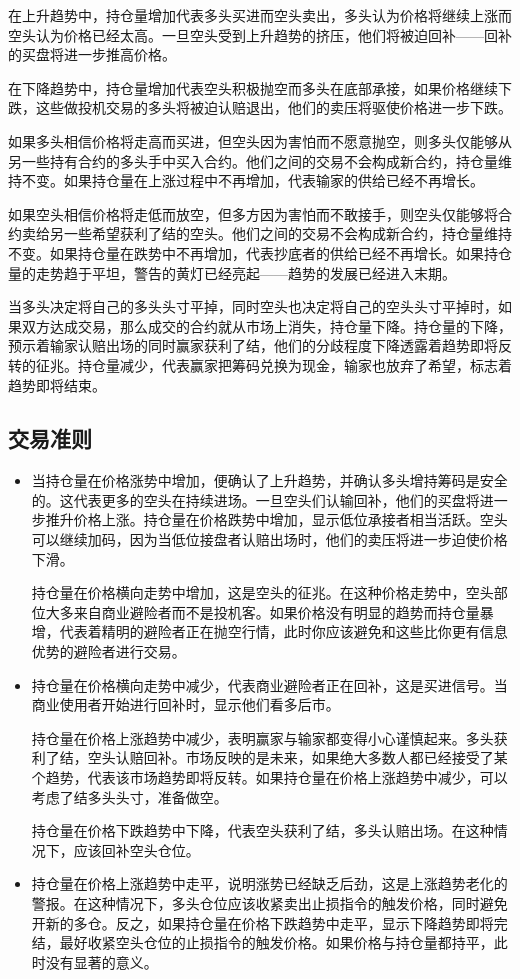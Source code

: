 在上升趋势中，持仓量增加代表多头买进而空头卖出，多头认为价格将继续上涨而空头认为价格已经太高。一旦空头受到上升趋势的挤压，他们将被迫回补——回补的买盘将进一步推高价格。

在下降趋势中，持仓量增加代表空头积极抛空而多头在底部承接，如果价格继续下跌，这些做投机交易的多头将被迫认赔退出，他们的卖压将驱使价格进一步下跌。

如果多头相信价格将走高而买进，但空头因为害怕而不愿意抛空，则多头仅能够从另一些持有合约的多头手中买入合约。他们之间的交易不会构成新合约，持仓量维持不变。如果持仓量在上涨过程中不再增加，代表输家的供给已经不再增长。

如果空头相信价格将走低而放空，但多方因为害怕而不敢接手，则空头仅能够将合约卖给另一些希望获利了结的空头。他们之间的交易不会构成新合约，持仓量维持不变。如果持仓量在跌势中不再增加，代表抄底者的供给已经不再增长。如果持仓量的走势趋于平坦，警告的黄灯已经亮起——趋势的发展已经进入末期。

当多头决定将自己的多头头寸平掉，同时空头也决定将自己的空头头寸平掉时，如果双方达成交易，那么成交的合约就从市场上消失，持仓量下降。持仓量的下降，预示着输家认赔出场的同时赢家获利了结，他们的分歧程度下降透露着趋势即将反转的征兆。持仓量减少，代表赢家把筹码兑换为现金，输家也放弃了希望，标志着趋势即将结束。
\subsection*{交易准则}

\begin{itemize}
    \item 当持仓量在价格涨势中增加，便确认了上升趋势，并确认多头增持筹码是安全的。这代表更多的空头在持续进场。一旦空头们认输回补，他们的买盘将进一步推升价格上涨。持仓量在价格跌势中增加，显示低位承接者相当活跃。空头可以继续加码，因为当低位接盘者认赔出场时，他们的卖压将进一步迫使价格下滑。

          持仓量在价格横向走势中增加，这是空头的征兆。在这种价格走势中，空头部位大多来自商业避险者而不是投机客。如果价格没有明显的趋势而持仓量暴增，代表着精明的避险者正在抛空行情，此时你应该避免和这些比你更有信息优势的避险者进行交易。
    \item 持仓量在价格横向走势中减少，代表商业避险者正在回补，这是买进信号。当商业使用者开始进行回补时，显示他们看多后市。

          持仓量在价格上涨趋势中减少，表明赢家与输家都变得小心谨慎起来。多头获利了结，空头认赔回补。市场反映的是未来，如果绝大多数人都已经接受了某个趋势，代表该市场趋势即将反转。如果持仓量在价格上涨趋势中减少，可以考虑了结多头头寸，准备做空。

          持仓量在价格下跌趋势中下降，代表空头获利了结，多头认赔出场。在这种情况下，应该回补空头仓位。
    \item 持仓量在价格上涨趋势中走平，说明涨势已经缺乏后劲，这是上涨趋势老化的警报。在这种情况下，多头仓位应该收紧卖出止损指令的触发价格，同时避免开新的多仓。反之，如果持仓量在价格下跌趋势中走平，显示下降趋势即将完结，最好收紧空头仓位的止损指令的触发价格。如果价格与持仓量都持平，此时没有显著的意义。
\end{itemize}
